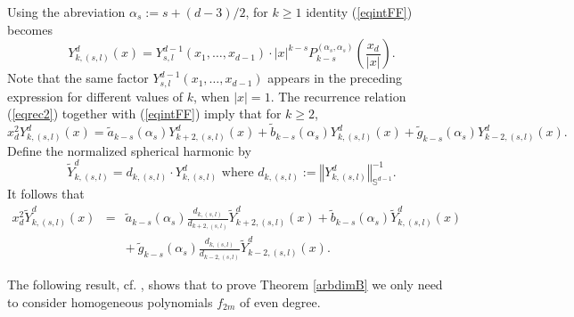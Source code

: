 \documentclass[12pt]{amsart}
\begin{document}
 Using the abreviation $\alpha _{s}:=s+\left( d-3\right) /2$, for $k\geq 1$ identity (\ref{eqintFF}) becomes 
\begin{equation*}
Y_{k,\left( s,l\right) }^{d}\left( x\right) 
=
Y_{s,l}^{d-1}\left(
x_{1},\dots ,x_{d-1}\right) \cdot \left\vert x\right\vert
^{k-s}P_{k-s}^{\left( \alpha _{s},\alpha _{s}\right) }\left( \frac{x_{d}}{
\left\vert x\right\vert }\right).
\end{equation*}
Note  that the same factor $Y_{s,l}^{d-1}\left(
x_{1},\dots,x_{d-1}\right)$ appears in the preceding expression for different values of $k$, when $\left\vert x\right\vert =1$. 
The recurrence relation (\ref{eqrec2}) together with (\ref{eqintFF}) imply that for $k\ge 2$,
\begin{equation*}
x_{d}^{2}Y_{k,\left( s,l\right) }^{d}\left( x\right) =\widetilde{a}
_{k-s}\left( \alpha _{s}\right) Y_{k+2,\left( s,l\right) }^{d}\left(
x\right) +\widetilde{b}_{k-s}\left( \alpha _{s}\right) Y_{k,\left(
s,l\right) }^{d}\left( x\right) +\widetilde{g}_{k-s}\left( \alpha
_{s}\right) Y_{k-2,\left( s,l\right) }^{d}\left( x\right).
\end{equation*}
\color{red}  \color{black}
  Define the normalized spherical
harmonic by
\begin{equation*}
\widetilde{Y}_{k,\left( s,l\right) }^{d}=d_{k,\left( s,l\right) }\cdot
Y_{k,\left( s,l\right) }^{d}\text{ where }d_{k,\left( s,l\right)
}:=\left\Vert Y_{k,\left( s,l\right) }^{d}\right\Vert _{\mathbb{S}
^{d-1}}^{-1}.
\end{equation*}
It follows that 
\begin{eqnarray}
x_{d}^{2}\widetilde{Y}_{k,\left( s,l\right) }^{d}\left( x\right) &
=
&
\widetilde{a}_{k-s}\left( \alpha _{s}\right) \frac{d_{k,\left( s,l\right) }}{
d_{k+2,\left( s,l\right) }} 
\widetilde{Y}_{k+2,\left( s,l\right) }^{d}\left(
x\right) +\widetilde{b}_{k-s}\left( \alpha _{s}\right) \widetilde{Y}
_{k,\left( s,l\right) }^{d}\left( x\right)  \label{eqrell} \\
&&
+ \  \widetilde{g}_{k-s}\left( \alpha _{s}\right) 
\frac{d_{k,\left( s,l\right) }}{d_{k-2,\left( s,l\right) }}
\widetilde{Y}_{k-2,\left( s,l\right)}^{d}\left( x\right)  
\label{eqrell2}.
\end{eqnarray}

The following result, cf. \cite[Lemma 12]{RendAl22}, shows that to prove Theorem \ref{arbdimB} we only need
to  consider homogeneous polynomials $f_{2m}$ of even degree.
\end{document}
